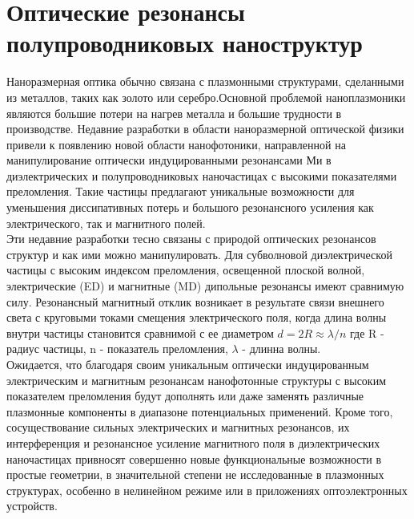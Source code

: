 \section{Оптические резонансы полупроводниковых наноструктур}
Наноразмерная оптика обычно связана с плазмонными структурами, сделанными из металлов, таких как золото или серебро.Основной проблемой наноплазмоники являются большие потери на нагрев металла и большие трудности в производстве. Недавние разработки в области наноразмерной оптической физики привели к появлению новой области нанофотоники, направленной на манипулирование оптически индуцированными резонансами Ми в диэлектрических и полупроводниковых наночастицах с высокими показателями преломления. Такие частицы предлагают уникальные возможности для уменьшения диссипативных потерь и большого резонансного усиления как электрического, так и магнитного полей. 
\\
\hspace*{2mm}
Эти недавние разработки тесно связаны с природой оптических резонансов структур и как ими можно манипулировать. Для субволновой диэлектрической частицы с высоким индексом преломления, освещенной плоской волной, электрические (ED) и магнитные (MD) дипольные резонансы имеют сравнимую силу. Резонансный магнитный отклик возникает в результате связи внешнего света с круговыми токами смещения электрического поля, когда длина волны внутри частицы становится сравнимой с ее диаметром $d = 2R \approx \lambda/n$ где R - радиус частицы, n - показатель преломления, $\lambda$ - длинна волны.
\\
\hspace*{2mm}
Ожидается, что благодаря своим уникальным оптически индуцированным электрическим и магнитным резонансам нанофотонные структуры с высоким показателем преломления будут дополнять или даже заменять различные плазмонные компоненты в диапазоне потенциальных применений. Кроме того, сосуществование сильных электрических и магнитных резонансов, их интерференция и резонансное усиление магнитного поля в диэлектрических наночастицах привносят совершенно новые функциональные возможности в простые геометрии, в значительной степени не исследованные в плазмонных структурах, особенно в нелинейном режиме или в приложениях оптоэлектронных устройств. 

